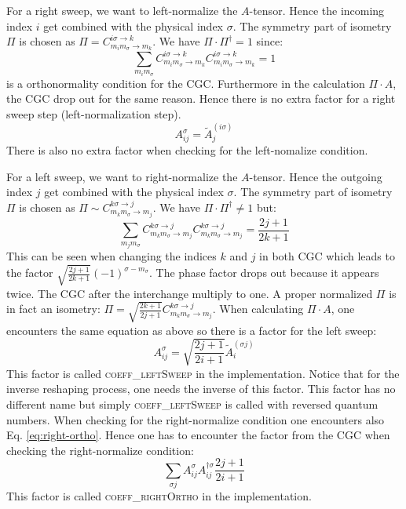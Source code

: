 \documentclass[a4paper,10pt,parskip=full]{scrartcl}
\begin{document}
For a right sweep, we want to left-normalize the $A$-tensor.
Hence the incoming index $i$ get combined with the physical index $\sigma$.
The symmetry part of isometry $\Pi$ is chosen as $\Pi=C^{i\sigma\rightarrow k}_{m_im_\sigma\rightarrow m_k}$.
We have $\Pi\cdot\Pi^\dagger=1$ since:
\begin{equation}
  \sum_{m_im_\sigma}C^{i\sigma\rightarrow k}_{m_im_\sigma\rightarrow m_k}C^{i\sigma\rightarrow k}_{m_im_\sigma\rightarrow m_k}=1
\end{equation}
is a orthonormality condition for the CGC.
Furthermore in the calculation $\Pi\cdot A$, the CGC drop out for the same reason.
Hence there is no extra factor for a right sweep step (left-normalization step).
\begin{equation}
  A^\sigma_{ij} = \tilde{A}^{(i\sigma)}_j
\end{equation}
There is also no extra factor when checking for the left-nomalize condition.

For a left sweep, we want to right-normalize the $A$-tensor.
Hence the outgoing index $j$ get combined with the physical index $\sigma$.
The symmetry part of isometry $\Pi$ is chosen as $\Pi\sim C^{k\sigma\rightarrow j}_{m_km_\sigma\rightarrow m_j}$.
We have $\Pi\cdot\Pi^\dagger\neq1$ but:
\begin{equation}
  \label{eq:right-ortho}
  \sum_{m_jm_\sigma}C^{k\sigma\rightarrow j}_{m_km_\sigma\rightarrow m_j}C^{k\sigma\rightarrow j}_{m_km_\sigma\rightarrow m_j}=\frac{2j+1}{2k+1}
\end{equation}
This can be seen when changing the indices $k$ and $j$ in both CGC which leads to the factor $\sqrt{\frac{2j+1}{2k+1}}(-1)^{\sigma-m_\sigma}$.
The phase factor drops out because it appears twice. The CGC after the interchange multiply to one.
A proper normalized $\Pi$ is in fact an isometry: $\Pi=\sqrt{\frac{2k+1}{2j+1}}C^{k\sigma\rightarrow j}_{m_km_\sigma\rightarrow m_j}$.
When calculating $\Pi\cdot A$, one encounters the same equation as above so there is a factor for the left sweep:
\begin{equation}
  A^\sigma_{ij} = \sqrt{\frac{2j+1}{2i+1}}\tilde{A}^{(\sigma j)}_i
\end{equation}
This factor is called \textsc{coeff\_leftSweep} in the implementation.
Notice that for the inverse reshaping process, one needs the inverse of this factor.
This factor has no different name but simply \textsc{coeff\_leftSweep} is called with reversed quantum numbers.
When checking for the right-normalize condition one encounters also Eq. \eqref{eq:right-ortho}.
Hence one has to encounter the factor from the CGC when checking the right-normalize condition:
\begin{equation}
  \sum_{\sigma j}A^\sigma_{ij}A^{\dagger\sigma}_{ij}\frac{2j+1}{2i+1} 
\end{equation}
This factor is called \textsc{coeff\_rightOrtho} in the implementation.
\end{document}
